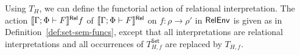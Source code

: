 \documentclass[runningheads]{llncs}
\newcommand{\set}{\mathsf{Set}}
\renewcommand{\id}{\mathit{id}}
\renewcommand{\id}{\mathit{id}}
\newcommand{\inl}{\mathsf{inL}\,}
\newcommand{\inr}{\mathsf{inR}\,}
\begin{document}
Using $T_H$, we can define the functorial action of relational
interpretation.
The action $\llbracket{\Gamma;\Phi \vdash F}\rrbracket^{\mathsf{Rel}} f$ of $\llbracket{\Gamma;\Phi
  \vdash F}\rrbracket^{\mathsf{Rel}}$ on $f : \rho \to \rho'$ in $\mathsf{RelEnv}$ is given as in
Definition~\ref{def:set-sem-funcs}, except that all interpretations
are relational interpretations and all occurrences of $T^\set_{H,f}$
are replaced by $T_{H,f}$.
\begin{comment}
as follows:
\begin{itemize}
\item If \,$\Gamma;\Phi \vdash \zerot$ then $\relsem{\Gamma;\Phi \vdash
  \zerot}f = \id_0$
\item If\, $\Gamma;\Phi \vdash \onet$ then $\relsem{\Gamma;\Phi \vdash
  \onet}f = \id_1$
\item If \,$\Gamma; \Phi
  \vdash \Nat^{\ol{\alpha}}\,F\,G$ then
  $\relsem{\Gamma; \Phi
    \vdash \Nat^{\ol{\alpha}}\,F\,G} f =$\\
\hspace*{0.2in} $\lambda t : \relsem{\Gamma;\Phi \vdash
    \Nat^{\ol{\alpha}}\,F\,G}\rho.\, 
  (\lambda \ol{A}. \relsem{\Gamma; \Phi,\ol\alpha \vdash G}f[\ol{\alpha
      := id_A}]) \circ t$  
\item If \,$\Gamma;\Phi \vdash \phi \ol{\tau}$, then
  $\relsem{\Gamma;\Phi \vdash \phi \ol{\tau}} f : \relsem{\Gamma;\Phi
  \vdash \phi \ol{\tau}}\rho \to \relsem{\Gamma;\Phi \vdash \phi
  \ol{\tau}}\rho' = (\rho\phi) \ol{\relsem{\Gamma;\Phi \vdash
    \tau}\rho} \to (\rho'\phi) \ol{\relsem{\Gamma;\Phi \vdash
    \tau}\rho'}$ is defined by $\relsem{\Gamma;\Phi \vdash \phi
  \tau{A}} f = (f\phi)_{\ol{\relsem{\Gamma;\Phi \vdash \tau}\rho'}}
  \,\circ\, (\rho\phi) \ol{\relsem{\Gamma;\Phi \vdash \tau}f} =
  (\rho'\phi) \ol{\relsem{\Gamma;\Phi \vdash \tau}f} \,\circ\, (f
  \phi)_{\ol{\relsem{\Gamma;\Phi \vdash \tau}\rho}}$
\item If\, $\Gamma;\Phi\vdash \sigma + \tau$ then $\relsem{\Gamma;\Phi
  \vdash \sigma + \tau}f$ is defined by $\relsem{\Gamma;\Phi \vdash
  \sigma + \tau}f(\inl\,x) = \inl\,(\relsem{\Gamma;\Phi \vdash
  \sigma}f x)$ and $\relsem{\Gamma;\Phi \vdash \sigma +
  \tau}f(\inr\,y) = \inr\,(\relsem{\Gamma;\Phi \vdash \tau}f y)$
\item If\, $\Gamma;\Phi\vdash \sigma \times \tau$ then
  $\relsem{\Gamma;\Phi \vdash \sigma \times \tau}f =
  \relsem{\Gamma;\Phi \vdash \sigma}f \times \relsem{\Gamma;\Phi
    \vdash \tau}f$
\item If\, $\Gamma;\Phi \vdash (\mu \phi^k.\lambda
  \ol{\alpha}. H)\ol{\tau}$ then $\relsem{\Gamma;\Phi \vdash (\mu
    \phi.\lambda \ol{\alpha}. H)\ol{\tau}} f = (\mu
  T_{H,f})\ol{\relsem{\Gamma;\Phi \vdash \tau}\rho'} \circ (\mu
  T_{H,\rho})\ol{\relsem{\Gamma;\Phi \vdash \tau}f} = (\mu
  T_{H,\rho'})\ol{\relsem{\Gamma;\Phi \vdash \tau}f} \circ (\mu
  T_{H,f})\ol{\relsem{\Gamma;\Phi \vdash \tau}\rho}$
\end{itemize}
\end{comment}
\end{document}
